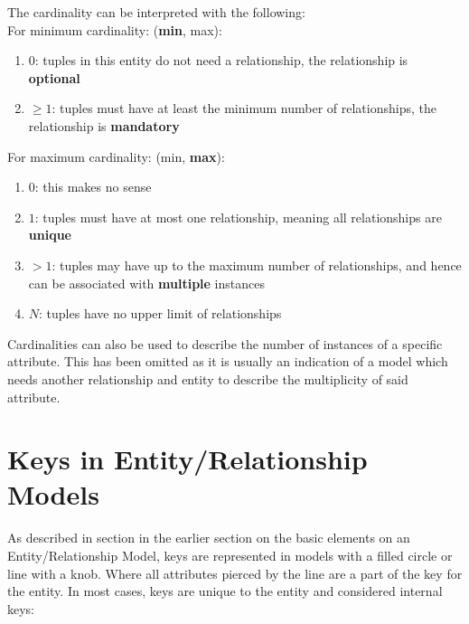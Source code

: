 \documentclass{report}
\begin{document}
The cardinality can be interpreted with the following:\\
For minimum cardinality: (\textbf{min}, max):
\begin{enumerate}
    \item $0$: tuples in this entity do not need a relationship, the relationship is \textbf{optional}
    \item $\geq1$: tuples must have at least the minimum number of relationships, the relationship is \textbf{mandatory}
\end{enumerate}
For maximum cardinality: (min, \textbf{max}):
\begin{enumerate}
    \item $0$: this makes no sense
    \item $1$: tuples must have at most one relationship, meaning all relationships are \textbf{unique}
    \item $>1$: tuples may have up to the maximum number of relationships, and hence can be associated with \textbf{multiple} instances
    \item $N$: tuples have no upper limit of relationships
\end{enumerate}

\vspace{.5cm}
 
\vspace{.5cm}
 

\begin{note}
    Cardinalities can also be used to describe the number of instances of a specific attribute. This has been omitted as it is usually an indication of a model which needs another relationship and entity to describe the multiplicity of said attribute. 
\end{note}


\section{Keys in Entity/Relationship Models}

As described in section in the earlier section on the basic elements on an Entity/Relationship Model, keys are represented in models with a filled circle or line with a knob. Where all attributes pierced by the line are a part of the key for the entity. In most cases, keys are unique to the entity and considered internal keys:
\end{document}
